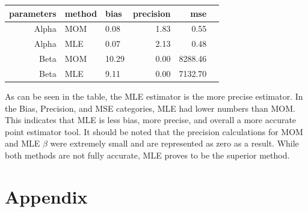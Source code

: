 \documentclass{article}\usepackage[]{graphicx}\usepackage[]{xcolor}
\newenvironment{Figure}
  {\par\medskip\noindent\minipage{\linewidth}}
  {\endminipage\par\medskip}
\begin{document}
\begin{multicols}{2}
\begin{Figure}
\centering
\begin{tabular}{rllrrr}
  \hline
 parameters & method & bias & precision & mse \\ 
  \hline
    Alpha & MOM & 0.08 & 1.83 & 0.55 \\ 
    Alpha & MLE & 0.07 & 2.13 & 0.48 \\ 
    Beta & MOM & 10.29 & 0.00 & 8288.46 \\ 
    Beta & MLE & 9.11 & 0.00 & 7132.70 \\ 
   \hline
\end{tabular}
\label{table1}
\end{Figure}

As can be seen in the table, the MLE estimator is the more precise estimator. In the Bias, Precision, and MSE categories, MLE had lower numbers than MOM. This indicates that MLE is less bias, more precise, and overall a more accurate point estimator tool. It should be noted that the precision calculations for MOM and MLE $\beta$ were extremely small and are represented as zero as a result. While both methods are not fully accurate, MLE proves to be the superior method.

\vspace{2em}
\begin{tiny}

\end{tiny}
\end{multicols}

\newpage
\onecolumn
\section{Appendix}
\end{document}

